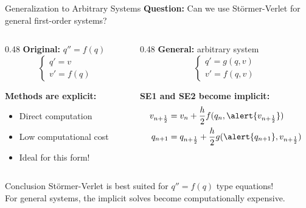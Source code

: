\documentclass[aspectratio=169]{beamer}
\begin{document}
\begin{frame}{Generalization to Arbitrary Systems}
\small
\textbf{Question:} Can we use Störmer-Verlet for general first-order systems?

\vspace{0.2cm}

\begin{columns}
\begin{column}{0.48\textwidth}
\textbf{Original:} $q'' = f(q)$
\begin{equation*}
\begin{cases}
    q' = v \\
    v' = f(q)
\end{cases}
\end{equation*}

\vspace{0.1cm}

\textbf{Methods are explicit:}
\begin{itemize}
    \item Direct computation
    \item Low computational cost
    \item Ideal for this form!
\end{itemize}
\end{column}

\begin{column}{0.48\textwidth}
\textbf{General:} arbitrary system
\begin{equation*}
\begin{cases}
    q' = g(q,v) \\
    v' = f(q,v)
\end{cases}
\end{equation*}

\vspace{0.1cm}

\textbf{SE1 and SE2 become implicit:}
\begin{align*}
    v_{n+\frac{1}{2}} &= v_n + \frac{h}{2}f(q_n, \alert{v_{n+\frac{1}{2}}}) \\
    q_{n+1} &= q_{n+\frac{1}{2}} + \frac{h}{2}g(\alert{q_{n+1}}, v_{n+\frac{1}{2}})
\end{align*}
\end{column}
\end{columns}

\vspace{0.3cm}

\begin{block}{Conclusion}
\centering
\alert{Störmer-Verlet is best suited for $q'' = f(q)$ type equations!}\\
For general systems, the implicit solves become computationally expensive.
\end{block}
\end{frame}
\end{document}
